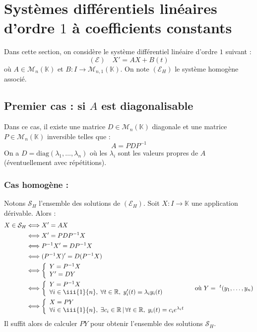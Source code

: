 \documentclass[french,11pt,twoside]{VcCours}
\begin{document}
\section{Systèmes différentiels linéaires d'ordre \texorpdfstring{$1$}{1} à coefficients constants}
Dans cette section, on considère le système différentiel linéaire d'ordre $1$ suivant :
$$ (\mathcal{E}) \quad X'=AX+B(t)$$
où $A \in \mathcal{M}_n(\mathbb{K})$ et $B : I  \rightarrow \mathcal{M}_{n,1}(\mathbb{K})$.
On note $(\mathcal{E}_H)$ le système homogène associé.
\subsection{Premier cas : si \texorpdfstring{$A$}{A} est diagonalisable}
Dans ce cas, il existe une matrice $D \in \mathcal{M}_n(\mathbb{K})$ diagonale et une matrice $P \in \mathcal{M}_n(\mathbb{K})$ inversible telles que :
$$ A=PDP^{-1}$$
On a $D= \textrm{diag}(\lambda_1, \ldots, \lambda_n)$ où les $\lambda_i$ sont les valeurs propres de $A$ (éventuellement avec répétitions).



\subsubsection*{Cas homogène :} Notons $\mathcal{S}_H$ l'ensemble des solutions de $(\mathcal{E}_H)$. Soit $X : I \rightarrow \mathbb{K}$ une application dérivable. Alors :
\begin{align*}
X \in \mathcal{S}_H & \Longleftrightarrow  X'=AX \\
& \Longleftrightarrow X'=PDP^{-1} X\\
& \Longleftrightarrow P^{-1}X'=DP^{-1}X \\
& \Longleftrightarrow (P^{-1}X)'=D(P^{-1}X) \\
& \Longleftrightarrow \left\lbrace \begin{array}{l}
Y=P^{-1}X \\
Y'=DY \\
\end{array}\right. \\
& \Longleftrightarrow \left\lbrace \begin{array}{l}
Y=P^{-1}X \\
\forall i \in \iii{1}{n}, \; \forall t \in  \mathbb{R},  \; y_i'(t)=\lambda_i y_i(t)  \\
\end{array}\right. \qquad \qquad \hbox{ où } Y= ~^t(y_1, \ldots, y_n) \\
& \Longleftrightarrow \left\lbrace \begin{array}{l}
X=PY \\
\forall i \in \iii{1}{n}, \; \exists c_i \in  \mathbb{R} \, \vert \, \forall t \in \mathbb{R}, \; y_i(t)=c_i e^{\lambda_i t}  \\
\end{array}\right.
\end{align*}
Il suffit alors de calculer $PY$ pour obtenir l'ensemble des solutions $\mathcal{S}_H$.
\end{document}
